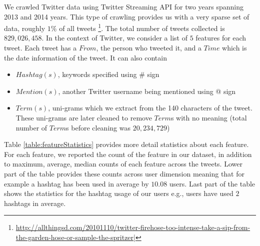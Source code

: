 We crawled Twitter data using Twitter Streaming API for two years spanning 2013 and 2014 years. This type of crawling provides us with a very sparse set of data, roughly $1\%$ of all tweets \footnote{\hyperref[]{http://allthingsd.com/20101110/twitter-firehose-too-intense-take-a-sip-from-the-garden-hose-or-sample-the-spritzer|}}. The total number of tweets collected is $829,026,458$. In the context of Twitter, we consider a list of $5$ features for each tweet. Each tweet has a $From$, the person who tweeted it, and a $Time$ which is the date information of the tweet. It can also contain 
\begin{itemize}
\item $Hashtag(s)$, keywords specified using \# sign
\item $Mention(s)$, another Twitter username being mentioned using @ sign
\item $Term(s)$, uni-grams which we extract from the 140 characters of the tweet. These uni-grams are later cleaned to remove $Term$s with no meaning (total number of $Term$s before cleaning was $20,234,729$)
\end{itemize}
Table \ref{table:featureStatistics} provides more detail statistics about each feature. For each feature, we reported the count of the feature in our dataset, in addition to maximum, average, median counts of each feature across the tweets. Lower part of the table provides these counts across user dimension meaning that for example a hashtag has been used in average by $10.08$ users. Last part of the table shows the statistics for the hashtag usage of our users e.g., users have used $2$ hashtags in average.

